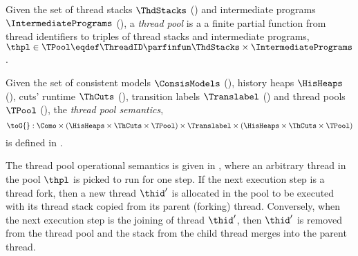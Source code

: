 
\begin{defn}
\label{def:thread_pools}
Given the set of thread stacks $\ThdStacks$ () and intermediate programs $\IntermediatePrograms$ (), a \emph{thread pool} is a a finite partial function from thread identifiers to triples of thread stacks and intermediate programs, \(\thpl \in \TPool \eqdef \ThreadID \parfinfun \ThdStacks \times \IntermediatePrograms\).
\end{defn}
 
\begin{defn} 
\label{def:thread_pool_semantics}
Given the set of consistent models \( \ConsisModels \) (), history heaps \(\HisHeaps\) (), cuts' runtime \(\ThCuts\) (), transition labels \( \Translabel \) () and thread pools  \( \TPool \) (), the \emph{thread pool semantics}, 
\[
	\toG{} : \Como \times (\HisHeaps \times \ThCuts \times \TPool) \times \Translabel \times (\HisHeaps \times \ThCuts \times \TPool) 
\]
is defined in .
\end{defn}
 
The thread pool operational semantics is given in , where an arbitrary thread in the pool \(\thpl\) is picked to run for one step.
If the next execution step is a thread fork, then a new thread \(\thid'\) is allocated in the pool to be executed with its thread stack copied from its parent (forking) thread.
Conversely, when the next execution step is the joining of thread \(\thid'\), then \(\thid'\) is removed from the thread pool and the stack from the child thread merges into the parent thread.


